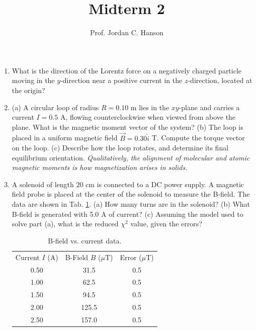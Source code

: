 \documentclass[12pt,twocolumn]{article}
\title{Midterm 2}
\author{Prof. Jordan C. Hanson}
\begin{document}
\maketitle
\small

\begin{enumerate}
\item What is the direction of the Lorentz force on a negatively charged particle moving in the $y$-direction near a positive current in the $z$-direction, located at the origin?
\item (a) A circular loop of radius $R = 0.10$ m lies in the $xy$-plane and carries a current $I = 0.5$ A, flowing counterclockwise when viewed from above the plane. What is the magnetic moment vector of the system? (b)  The loop is placed in a uniform magnetic field $\vec{B} = 0.30\hat{i}$ T.  Compute the torque vector on the loop.  (c) Describe how the loop rotates, and determine its final equilibrium orientation.  \textit{Qualitatively, the alignment of molecular and atomic magnetic moments is how magnetization arises in solids.}
\item A solenoid of length 20 cm is connected to a DC power supply.  A magnetic field probe is placed at the center of the solenoid to measure the B-field. The data are shown in Tab. \ref{tab:1}. (a)  How many turns are in the solenoid? (b) What B-field is generated with 5.0 A of current? (c) Assuming the model used to solve part (a), what is the reduced $\chi^2$ value, given the errors?

\begin{table}
\centering
\begin{tabular}{| c c c |}
\hline
Current $I$ (A) & B-Field $B$ ($\mu$T) & Error ($\mu$T) \\
0.50 & 31.5 & 0.5 \\
1.00 & 62.5 & 0.5 \\
1.50 & 94.5 & 0.5 \\
2.00 & 125.5 & 0.5 \\
2.50 & 157.0 & 0.5 \\
\hline
\end{tabular}
\caption{\label{tab:1} B-field vs. current data.}
\end{table}


\end{enumerate}
\end{document}
